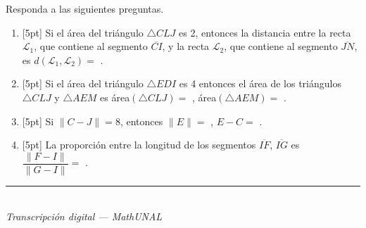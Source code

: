 \documentclass[11pt]{article}
\newcommand{\examfooter}{%
  \vfill
  \rule{\linewidth}{0.4pt}\\[1pt]
  {\scriptsize\textit{Transcripción digital --- MathUNAL}\hfill\textcolor{unalblue}{\textbf{\thepage}}}
}
\begin{document}
\begin{enumerate}
Responda a las siguientes preguntas.

\begin{enumerate}[label=(\alph*)]
\item{}[5pt] Si el área del triángulo $\triangle CLJ$ es 2, entonces la distancia entre la recta $\mathcal{L}_1$, que contiene al segmento $\overline{CI}$, y la recta $\mathcal{L}_2$, que contiene al segmento $\overline{JN}$, es $d(\mathcal{L}_1,\mathcal{L}_2)=$ \underline{\hspace{3cm}}.
\item{}[5pt] Si el área del triángulo $\triangle EDI$ es 4 entonces el área de los triángulos $\triangle CLJ$ y $\triangle AEM$ es área$(\triangle CLJ)=$ \underline{\hspace{2cm}}, área$(\triangle AEM)=$ \underline{\hspace{2cm}}.
\item{}[5pt] Si $\|C-J\|=8$, entonces $\|E\|=$ \underline{\hspace{2cm}}, $E-C=$ \underline{\hspace{2cm}}.
\item{}[5pt] La proporción entre la longitud de los segmentos $\overline{IF}$, $\overline{IG}$ es $\dfrac{\|F-I\|}{\|G-I\|}=$ \underline{\hspace{3cm}}.
\end{enumerate}
\end{enumerate}

\examfooter
\end{document}
